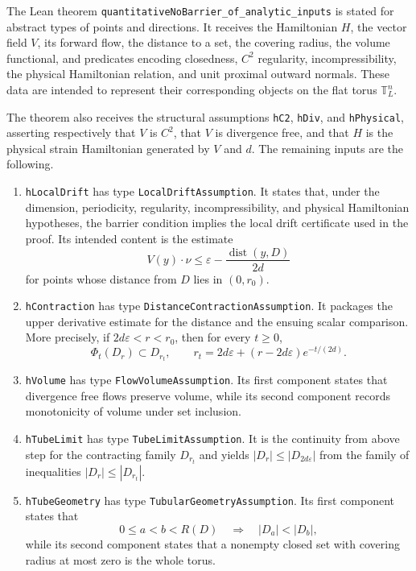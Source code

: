 \documentclass[11pt,reqno,noamsfonts]{amsart}
\theoremstyle{definition}
\theoremstyle{remark}
\newcommand{\T}{\mathbb T}
\begin{document}
The Lean theorem
\texttt{quantitativeNoBarrier\_of\_analytic\_inputs} is stated for abstract
types of points and directions. It receives the Hamiltonian $H$, the vector
field $V$, its forward flow, the distance to a set, the covering radius, the
volume functional, and predicates encoding closedness, $C^2$ regularity,
incompressibility, the physical Hamiltonian relation, and unit proximal
outward normals. These data are intended to represent their corresponding
objects on the flat torus $\T_L^n$.

The theorem also receives the structural assumptions
\texttt{hC2}, \texttt{hDiv}, and \texttt{hPhysical}, asserting respectively
that $V$ is $C^2$, that $V$ is divergence free, and that $H$ is the physical
strain Hamiltonian generated by $V$ and $d$. The remaining inputs are the
following.

\begin{enumerate}[label=\textbf{(A\arabic*)}]
\item \texttt{hLocalDrift} has type
\texttt{LocalDriftAssumption}. It states that, under the dimension,
periodicity, regularity, incompressibility, and physical Hamiltonian
hypotheses, the barrier condition implies the local drift certificate used in
the proof. Its intended content is the estimate
\[
  V(y)\cdot\nu
  \le
  \varepsilon-
  \frac{\operatorname{dist}(y,D)}{2d}
\]
for points whose distance from $D$ lies in $(0,r_0)$.

\item \texttt{hContraction} has type
\texttt{DistanceContractionAssumption}. It packages the upper derivative
estimate for the distance and the ensuing scalar comparison. More precisely,
if $2d\varepsilon<r<r_0$, then for every $t\ge0$,
\[
  \Phi_t(D_r)
  \subset
  D_{r_t},
  \qquad
  r_t
  =
  2d\varepsilon+
  (r-2d\varepsilon)e^{-t/(2d)}.
\]

\item \texttt{hVolume} has type
\texttt{FlowVolumeAssumption}. Its first component states that divergence
free flows preserve volume, while its second component records monotonicity
of volume under set inclusion.

\item \texttt{hTubeLimit} has type
\texttt{TubeLimitAssumption}. It is the continuity from above step for the
contracting family $D_{r_t}$ and yields
  $|D_r|\le |D_{2d\varepsilon}|$ 
from the family of inequalities
$|D_r|\le |D_{r_t}|$.

\item \texttt{hTubeGeometry} has type
\texttt{TubularGeometryAssumption}. Its first component states that
\[
  0\le a<b<R(D)
  \quad\Longrightarrow\quad
  |D_a|<|D_b|,
\]
while its second component states that a nonempty closed set with covering
radius at most zero is the whole torus.
\end{enumerate}
\end{document}
